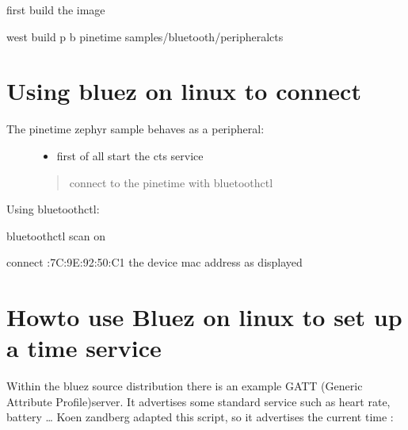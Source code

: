\documentclass[letterpaper,10pt,english]{sphinxmanual}
\begin{document}
first build the image

\begin{sphinxVerbatim}[commandchars=\\\{\}]
  west build \PYGZhy{}p \PYGZhy{}b pinetime samples/bluetooth/peripheral\PYGZhy{}cts
\end{sphinxVerbatim}


\section{Using bluez on linux to connect}
\label{\detokenize{current-time:using-bluez-on-linux-to-connect}}\begin{description}
\item[{The pinetime zephyr sample behaves as a peripheral:}] \leavevmode\begin{itemize}
\item {} 
first of all start the cts service

\end{itemize}
\begin{quote}

\sphinxhyphen{}connect to the pinetime with bluetoothctl
\end{quote}

\end{description}

Using bluetoothctl:

\begin{sphinxVerbatim}[commandchars=\\\{\}]
bluetoothctl
scan on


connect :7C:9E:92:50:C1 the device mac address as displayed
\end{sphinxVerbatim}


\section{Howto use Bluez on linux to set up a time service}
\label{\detokenize{current-time:howto-use-bluez-on-linux-to-set-up-a-time-service}}
Within the bluez source distribution there is an example GATT (Generic Attribute Profile)server. It advertises some standard service such as heart rate, battery …
Koen zandberg adapted this script, so it advertises the current time :
\end{document}

